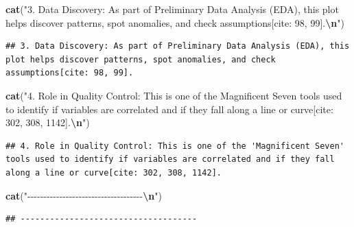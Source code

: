 \documentclass[
]{article}
\newenvironment{Shaded}{\begin{snugshade}}{\end{snugshade}}
\newcommand{\FunctionTok}[1]{\textcolor[rgb]{0.13,0.29,0.53}{\textbf{#1}}}
\newcommand{\NormalTok}[1]{#1}
\newcommand{\SpecialCharTok}[1]{\textcolor[rgb]{0.81,0.36,0.00}{\textbf{#1}}}
\newcommand{\StringTok}[1]{\textcolor[rgb]{0.31,0.60,0.02}{#1}}
\begin{document}
\begin{Shaded}
\begin{Highlighting}[]
\FunctionTok{cat}\NormalTok{(}\StringTok{"3. Data Discovery: As part of Preliminary Data Analysis (EDA), this plot helps discover patterns, spot anomalies, and check assumptions[cite: 98, 99].}\SpecialCharTok{\textbackslash{}n}\StringTok{"}\NormalTok{)}
\end{Highlighting}
\end{Shaded}

\begin{verbatim}
## 3. Data Discovery: As part of Preliminary Data Analysis (EDA), this plot helps discover patterns, spot anomalies, and check assumptions[cite: 98, 99].
\end{verbatim}

\begin{Shaded}
\begin{Highlighting}[]
\FunctionTok{cat}\NormalTok{(}\StringTok{"4. Role in Quality Control: This is one of the \textquotesingle{}Magnificent Seven\textquotesingle{} tools used to identify if variables are correlated and if they fall along a line or curve[cite: 302, 308, 1142].}\SpecialCharTok{\textbackslash{}n}\StringTok{"}\NormalTok{)}
\end{Highlighting}
\end{Shaded}

\begin{verbatim}
## 4. Role in Quality Control: This is one of the 'Magnificent Seven' tools used to identify if variables are correlated and if they fall along a line or curve[cite: 302, 308, 1142].
\end{verbatim}

\begin{Shaded}
\begin{Highlighting}[]
\FunctionTok{cat}\NormalTok{(}\StringTok{"{-}{-}{-}{-}{-}{-}{-}{-}{-}{-}{-}{-}{-}{-}{-}{-}{-}{-}{-}{-}{-}{-}{-}{-}{-}{-}{-}{-}{-}{-}{-}{-}{-}{-}{-}{-}}\SpecialCharTok{\textbackslash{}n}\StringTok{"}\NormalTok{)}
\end{Highlighting}
\end{Shaded}

\begin{verbatim}
## ------------------------------------
\end{verbatim}
\end{document}
